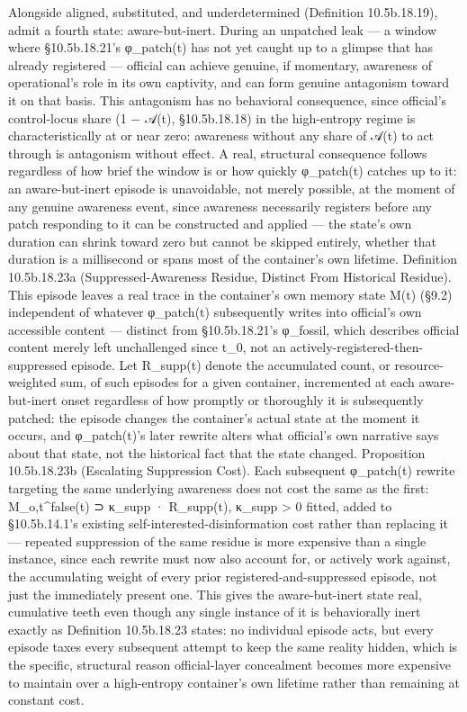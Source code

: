 \documentclass[
]{article}
\begin{document}
Alongside aligned, substituted, and underdetermined (Definition
10.5b.18.19), admit a fourth state: aware-but-inert. During an unpatched
leak --- a window where §10.5b.18.21's φ\_patch(t) has not yet caught up
to a glimpse that has already registered --- official can achieve
genuine, if momentary, awareness of operational's role in its own
captivity, and can form genuine antagonism toward it on that basis. This
antagonism has no behavioral consequence, since official's control-locus
share (1 − 𝒜(t), §10.5b.18.18) in the high-entropy regime is
characteristically at or near zero: awareness without any share of 𝒜(t)
to act through is antagonism without effect. A real, structural
consequence follows regardless of how brief the window is or how quickly
φ\_patch(t) catches up to it: an aware-but-inert episode is unavoidable,
not merely possible, at the moment of any genuine awareness event, since
awareness necessarily registers before any patch responding to it can be
constructed and applied --- the state's own duration can shrink toward
zero but cannot be skipped entirely, whether that duration is a
millisecond or spans most of the container's own lifetime. Definition
10.5b.18.23a (Suppressed-Awareness Residue, Distinct From Historical
Residue). This episode leaves a real trace in the container's own memory
state M(t) (§9.2) independent of whatever φ\_patch(t) subsequently
writes into official's own accessible content --- distinct from
§10.5b.18.21's φ\_fossil, which describes official content merely left
unchallenged since t\_0, not an actively-registered-then-suppressed
episode. Let R\_supp(t) denote the accumulated count, or
resource-weighted sum, of such episodes for a given container,
incremented at each aware-but-inert onset regardless of how promptly or
thoroughly it is subsequently patched: the episode changes the
container's actual state at the moment it occurs, and φ\_patch(t)'s
later rewrite alters what official's own narrative says about that
state, not the historical fact that the state changed. Proposition
10.5b.18.23b (Escalating Suppression Cost). Each subsequent φ\_patch(t)
rewrite targeting the same underlying awareness does not cost the same
as the first: M\_o,t\^{}false(t) ⊃ κ\_supp · R\_supp(t), κ\_supp
\textgreater{} 0 fitted, added to §10.5b.14.1's existing
self-interested-disinformation cost rather than replacing it ---
repeated suppression of the same residue is more expensive than a single
instance, since each rewrite must now also account for, or actively work
against, the accumulating weight of every prior
registered-and-suppressed episode, not just the immediately present one.
This gives the aware-but-inert state real, cumulative teeth even though
any single instance of it is behaviorally inert exactly as Definition
10.5b.18.23 states: no individual episode acts, but every episode taxes
every subsequent attempt to keep the same reality hidden, which is the
specific, structural reason official-layer concealment becomes more
expensive to maintain over a high-entropy container's own lifetime
rather than remaining at constant cost.
\end{document}
